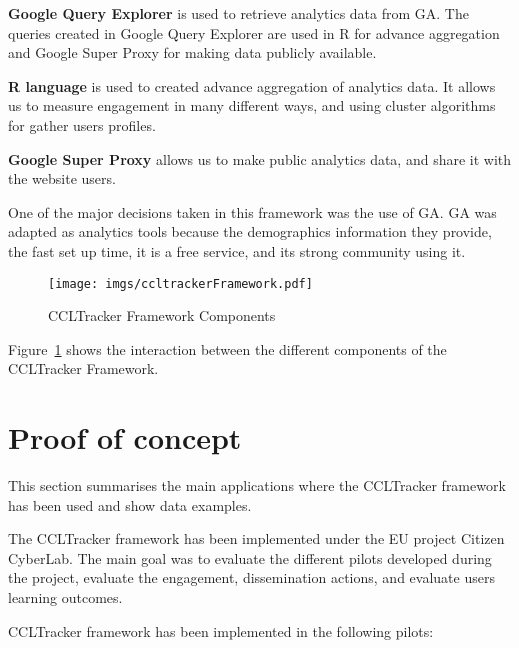 \documentclass{article}
\begin{document}
\textbf{Google Query Explorer} is used to retrieve analytics data from GA. The queries created in Google Query Explorer are used in R for advance aggregation and Google Super Proxy for making data publicly available. 

\textbf{R language} is used to created advance aggregation of analytics data. It allows us to measure engagement in many different ways, and using cluster algorithms for gather users profiles. 

\textbf{Google Super Proxy} allows us to make public analytics data, and share it with the website users. 


One of the major decisions taken in this framework was the use of GA. GA was adapted as analytics tools because the demographics information they provide, the fast set up time, it is a free service, and its strong community using it. 



\begin{figure}[t]
  \begin{center}
		\texttt{[image: imgs/ccltrackerFramework.pdf]}
  \end{center}
\caption{CCLTracker Framework Components}
\label{img:CCLTrackerFrameworkComponents}
\end{figure}

Figure~\ref{img:CCLTrackerFrameworkComponents} shows the interaction between the different components of the CCLTracker Framework. 




\section{Proof of concept}

This section summarises the main applications where the CCLTracker framework has been used and show data examples. 

The CCLTracker framework has been implemented under the EU project Citizen CyberLab. The main goal was to evaluate the different pilots developed during the project, evaluate the engagement, dissemination actions, and evaluate users learning outcomes.

CCLTracker framework has been implemented in the following pilots:
\end{document}
